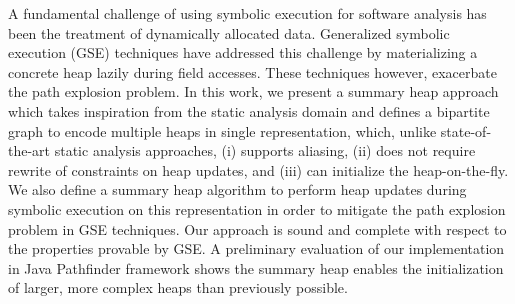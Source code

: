 A fundamental challenge of using symbolic execution for software
analysis has been the treatment of dynamically allocated
data. Generalized symbolic execution (GSE) techniques have addressed
this challenge by materializing a concrete heap lazily during field
accesses.  These techniques however, exacerbate the path explosion
problem.  In this work, we present a summary heap approach which takes
inspiration from the static analysis domain and defines a bipartite
graph to encode multiple heaps in single representation, which, unlike
state-of-the-art static analysis approaches, (i) supports aliasing,
(ii) does not require rewrite of constraints on heap updates, and
(iii) can initialize the heap-on-the-fly. We also define a summary
heap algorithm to perform heap updates during symbolic execution on
this representation in order to mitigate the path explosion problem in
GSE techniques. Our approach is sound and complete with respect to the
properties provable by GSE. A preliminary evaluation of our
implementation in Java Pathfinder framework shows the summary heap
enables the initialization of larger, more complex heaps than
previously possible.
